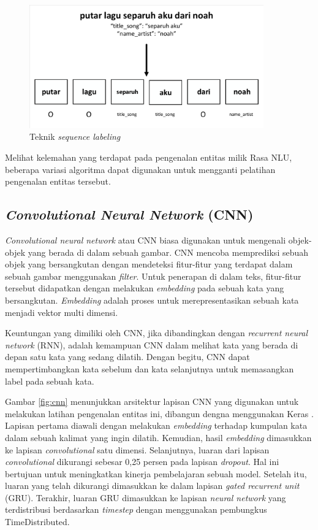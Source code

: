 \begin{figure}[H]
	\centering
	\includegraphics[width=0.9\textwidth, trim=2 2 2 2, clip]{resources/3/sequence_labeling.pdf}
	\caption{Teknik \textit{sequence labeling}}
	\label{fig:sequence_labeling}
\end{figure}

Melihat kelemahan yang terdapat pada pengenalan entitas milik Rasa NLU, beberapa variasi algoritma dapat digunakan untuk mengganti pelatihan pengenalan entitas tersebut.

\subsection{\textit{Convolutional Neural Network} (CNN)}

\textit{Convolutional neural network} atau CNN biasa digunakan untuk mengenali objek-objek yang berada di dalam sebuah gambar. CNN mencoba memprediksi sebuah objek yang bersangkutan dengan mendeteksi fitur-fitur yang terdapat dalam sebuah gambar menggunakan \textit{filter}. Untuk penerapan di dalam teks, fitur-fitur tersebut didapatkan dengan melakukan \textit{embedding} pada sebuah kata yang bersangkutan. \textit{Embedding} adalah proses untuk merepresentasikan sebuah kata menjadi vektor multi dimensi.

Keuntungan yang dimiliki oleh CNN, jika dibandingkan dengan \textit{recurrent neural network} (RNN), adalah kemampuan CNN dalam melihat kata yang berada di depan satu kata yang sedang dilatih. Dengan begitu, CNN dapat mempertimbangkan kata sebelum dan kata selanjutnya untuk memasangkan label pada sebuah kata.

Gambar \ref{fig:cnn} menunjukkan arsitektur lapisan CNN yang digunakan untuk melakukan latihan pengenalan entitas ini, dibangun dengna menggunakan Keras \parencite{sasank2017spoken}. Lapisan pertama diawali dengan melakukan \textit{embedding} terhadap kumpulan kata dalam sebuah kalimat yang ingin dilatih. Kemudian, hasil \textit{embedding} dimasukkan ke lapisan \textit{convolutional} satu dimensi. Selanjutnya, luaran dari lapisan \textit{convolutional} dikurangi sebesar 0,25 persen pada lapisan \textit{dropout}. Hal ini bertujuan untuk meningkatkan kinerja pembelajaran sebuah model. Setelah itu, luaran yang telah dikurangi dimasukkan ke dalam lapisan \textit{gated recurrent unit} (GRU). Terakhir, luaran GRU dimasukkan ke lapisan \textit{neural network} yang terdistribusi berdasarkan \textit{timestep} dengan menggunakan pembungkus TimeDistributed.

